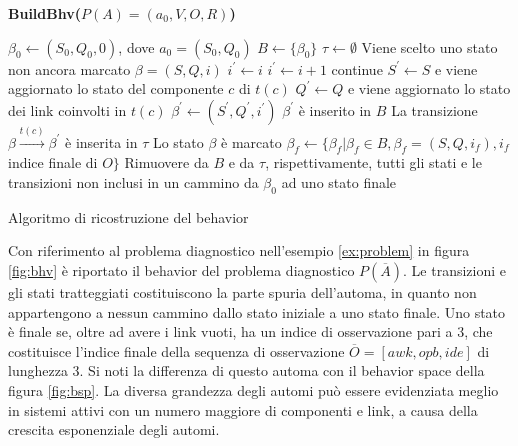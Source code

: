 \begin{algorithm}
\textbf{BuildBhv($P(A) = (a_0,V,O,R)$)}
\begin{algorithmic}
	\STATE $\beta_0 \leftarrow (S_0,Q_0,0)$, dove $a_0 = (S_0,Q_0)$
	\STATE $B \leftarrow \{\beta_0\}$
	\STATE $\tau \leftarrow \emptyset$
	\REPEAT
		\STATE Viene scelto uno stato non ancora marcato $\beta = (S,Q,i)$
				\STATE $i^\prime \leftarrow i$
				\STATE $i^\prime \leftarrow i+1$
			\ELSE
				\STATE continue
			\ENDIF
			\STATE $S^\prime \leftarrow S$ e viene aggiornato lo stato del componente $c$ di $t(c)$
			\STATE $Q^\prime \leftarrow Q$ e viene aggiornato lo stato dei link coinvolti in $t(c)$
			\STATE $\beta^\prime \leftarrow (S^\prime,Q^\prime,i^\prime)$
				\STATE $\beta^\prime$ è inserito in $B$
			\ENDIF
			\STATE La transizione $\beta \xrightarrow{t(c)} \beta^\prime$ è inserita in $\tau$
		\ENDFOR
		\STATE Lo stato $\beta$ è marcato
	\STATE $\beta_f \leftarrow \{\beta_f | \beta_f \in B, \beta_f=(S,Q,i_f), i_f$  indice finale di $O\}$
	\STATE Rimuovere da $B$ e da $\tau$, rispettivamente, tutti gli stati e le transizioni non inclusi in un cammino da $\beta_0$ ad uno stato finale
\end{algorithmic}
\caption{Algoritmo di ricostruzione del behavior}
\label{alg:bhv}
\end{algorithm}

\begin{ex}
Con riferimento al problema diagnostico nell'esempio \ref{ex:problem} in figura \ref{fig:bhv} è riportato  il behavior del problema diagnostico $P(\overline{A})$. Le transizioni e gli stati tratteggiati costituiscono la parte spuria dell'automa, in quanto non appartengono a nessun cammino dallo stato iniziale a uno stato finale. Uno stato è finale se, oltre ad avere i link vuoti, ha un indice di osservazione pari a $3$, che costituisce l'indice finale della sequenza di osservazione $\overline{O} = [awk,opb,ide]$ di lunghezza $3$.
Si noti la differenza di questo automa con il behavior space della figura \ref{fig:bsp}. 
La diversa grandezza degli automi può essere evidenziata meglio in sistemi attivi con un numero maggiore di componenti e link, a causa della crescita esponenziale degli automi.
\end{ex}

